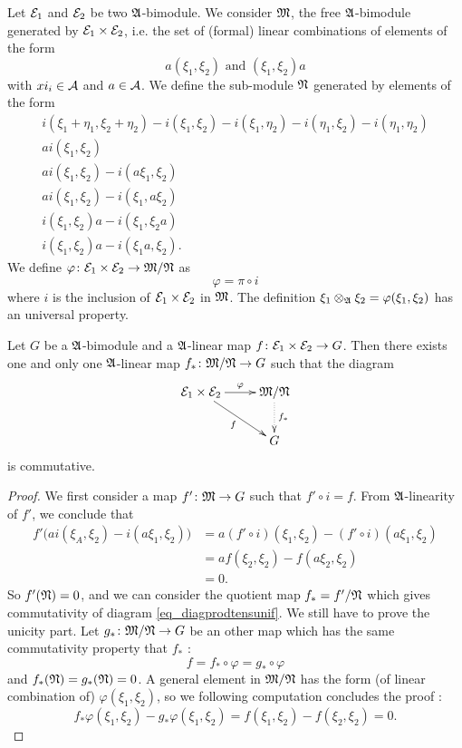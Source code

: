 Let $\mathcal{E}_1$ and $\mathcal{E}_2$ be two $\mathfrak{A}$-bimodule. We consider $\mathfrak{M}$, the free $\mathfrak{A}$-bimodule generated by $\mathcal{E}_1\times\mathcal{E}_2$, i.e. the set of (formal) linear combinations of elements of the form
\[ 
  a(\xi_1,\xi_2)\text{ and }(\xi_1,\xi_2)a
\]
with $xi_i\in\mathcal{A}$ and $a\in\mathcal{A}$. We define the sub-module $\mathfrak{N}$ generated by elements of the form
\begin{subequations}
\begin{align}
i(\xi_1+\eta_1,\xi_2+\eta_2)-i(\xi_1,\xi_2)-i(\xi_1,\eta_2)-i(\eta_1,\xi_2)-i(\eta_1,\eta_2)\\
ai(\xi_1,\xi_2)\\
ai(\xi_1,\xi_2)-i(a\xi_1,\xi_2)\\
ai(\xi_1,\xi_2)-i(\xi_1,a\xi_2)\\
i(\xi_1,\xi_2)a-i(\xi_1,\xi_2a)\\
i(\xi_1,\xi_2)a-i(\xi_1a,\xi_2).
\end{align}
\end{subequations}
We define $\varphi\colon \mathcal{E}_1\times\mathcal{E}_2\to \mathfrak{M}/\mathfrak{N}$ as 
\[ 
  \varphi=\pi\circ i
\]
where $i$ is the inclusion of $\mathcal{E}_1\times\mathcal{E}_2$ in $\mathfrak{M}$. The definition $\xi_1\otimes_{\mathfrak{A}}\xi_2=\varphi(\xi_1,\xi_2)$ has an universal property.

\begin{proposition}
Let $G$ be a $\mathfrak{A}$-bimodule and a $\mathfrak{A}$-linear map $f\colon \mathcal{E}_1\times\mathcal{E}_2\to G$. Then there exists one and only one $\mathfrak{A}$-linear map $f_*\colon \mathfrak{M}/\mathfrak{N}\to G$ such that the diagram
\begin{equation}  \label{eq_diagprodtensunif}
\xymatrix{%
   \modE_1\times\modE_2 \ar[r]^-{\varphi}\ar[dr]_{f}		&	\modM/\modN\ar@{.>}[d]^{f_*}\\
   	&	G
}
\end{equation}
is commutative.
\end{proposition}

\begin{proof}
We first consider a map $f'\colon \mathfrak{M}\to G$ such that $f'\circ i=f$. From $\mathfrak{A}$-linearity of $f'$, we conclude that
\[ 
 \begin{split}
f'\big( ai(\xi_A,\xi_2)-i(a\xi_1,\xi_2) \big)&=a(f'\circ i)(\xi_1,\xi_2)-(f'\circ i)(a\xi_1,\xi_2)\\
		&=af(\xi_2,\xi_2)-f(a\xi_2,\xi_2)\\
		&=0.
\end{split} 
\]
So $f'(\mathfrak{N})=0$, and we can consider the quotient map $f_*=f'/\mathfrak{N}$ which gives commutativity of diagram \eqref{eq_diagprodtensunif}. We still have to prove the unicity part. Let $g_*\colon \mathfrak{M}/\mathfrak{N}\to G$ be an other map which has the same commutativity property that $f_*$ :
\[ 
  f=f_*\circ \varphi=g_*\circ\varphi
\]
and $f_*(\mathfrak{N})=g_*(\mathfrak{N})=0$. A general element in $\mathfrak{M}/\mathfrak{N}$ has the form (of linear combination of) $\varphi(\xi_1,\xi_2)$, so we following computation concludes the proof :
\[ 
  f_*\varphi(\xi_1,\xi_2)-g_*\varphi(\xi_1,\xi_2)=f(\xi_1,\xi_2)-f(\xi_2,\xi_2)=0.
\]
\end{proof}

